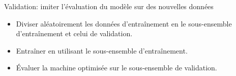 

\begin{frame}{\vskip -0.2cm \Large Validation: \footnotesize imiter l'\'evaluation du mod\`ele sur des nouvelles donn\'ees}

\footnotesize
\begin{itemize}
\pause
\item
	\vskip -0.1cm
	Diviser al\'eatoirement
	les donn\'ees d'entra\^inement
	en le sous-ensemble d'entra\^inement et celui de validation.
\pause
\item
	Entra\^iner en utilisant le sous-ensemble d'entra\^inement.
\pause
\item
	\'{E}valuer la machine optimis\'ee sur le sous-ensemble de validation.
\end{itemize}

\pause

\scriptsize
\begin{multicols}{2}

	\begin{flushleft}


	\end{flushleft}

\columnbreak

	\begin{flushright}
	\begin{minipage}{5.0cm}


	\end{minipage}
	\end{flushright}

\end{multicols}

\end{frame}
\normalsize

